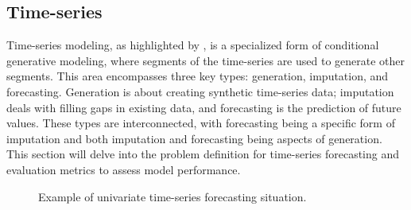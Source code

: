 \subsection{Time-series} \label{sec:time-series}
Time-series modeling, as highlighted by \textcite{koo_comprehensive_2023, lin_diffusion_2023}, is a specialized form of conditional generative modeling, where segments of the time-series are used to generate other segments. This area encompasses three key types: generation, imputation, and forecasting. Generation is about creating synthetic time-series data; imputation deals with filling gaps in existing data, and forecasting is the prediction of future values. These types are interconnected, with forecasting being a specific form of imputation and both imputation and forecasting being aspects of generation. This section will delve into the problem definition for time-series forecasting and evaluation metrics to assess model performance.

\begin{figure}[hb]
\centering
{}
\caption{Example of univariate time-series forecasting situation.}
\label{fig:time-series-univariate}
\end{figure}


